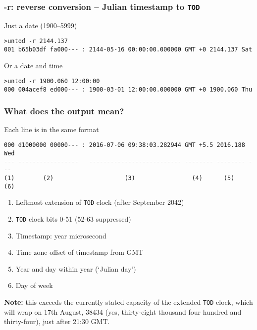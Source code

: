 \documentclass[10pt,xcolor=x11names]{beamer}
\newcommand{\tod}{\texttt{TOD}}
\begin{document}
\begin{frame}[fragile]
  \frametitle{-r: reverse conversion -- Julian timestamp to \tod{}}
  \begin{block}{Just a date (1900--5999)}
  \begin{lstlisting}
>untod -r 2144.137
001 b65b03df fa000--- : 2144-05-16 00:00:00.000000 GMT +0 2144.137 Sat
  \end{lstlisting}
  \end{block}
  \begin{block}{Or a date and time}
  \begin{lstlisting}
>untod -r 1900.060 12:00:00
000 004acef8 ed000--- : 1900-03-01 12:00:00.000000 GMT +0 1900.060 Thu
  \end{lstlisting}
  \end{block}

\end{frame}

\begin{frame}[fragile]
  \frametitle{What does the output mean?}
  \begin{block}{Each line is in the same format}
  \begin{lstlisting}
000 d1000000 00000--- : 2016-07-06 09:38:03.282944 GMT +5.5 2016.188 Wed
--- -----------------   -------------------------- -------- -------- ---
(1)        (2)                    (3)                (4)      (5)    (6)
  \end{lstlisting}
  \end{block}
  \begin{enumerate}
  \item Leftmost extension of \tod{} clock (after September 2042)
  \item \tod{} clock bits 0-51 (52-63 suppressed)
  \item Timestamp: year \textellipsis{} microsecond
  \item Time zone offset of timestamp from GMT
  \item Year and day within year (`Julian day')
  \item Day of week
  \end{enumerate}

  \textbf{Note:} this exceeds the currently stated capacity of the
  extended \tod{} clock, which will wrap on 17th August, 38434
  (yes,   thirty-eight thousand four hundred and thirty-four),
  just after 21:30 GMT. 

\end{frame}
\end{document}
